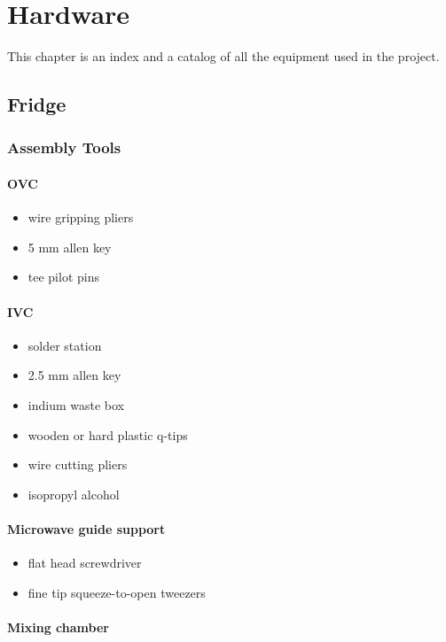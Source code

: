 

\chapter{Hardware}
\label{hardware}
This chapter is an index and a catalog of all the equipment used in the project.
 
\section{Fridge}
  \subsection{Assembly Tools}
\subsubsection{OVC}

\begin{itemize}
  \item wire gripping pliers
  \item 5 mm allen key
  \item tee pilot pins  
\end{itemize}

\subsubsection{IVC}
\begin{itemize}
  \item solder station
  \item 2.5 mm allen key
  \item indium waste box
  \item wooden or hard plastic q-tips
  \item wire cutting pliers
  \item isopropyl alcohol 
\end{itemize}

\subsubsection{Microwave guide support}

\begin{itemize}
  \item flat head screwdriver
  \item fine tip squeeze-to-open tweezers 
\end{itemize}
 
\subsubsection{Mixing chamber}

